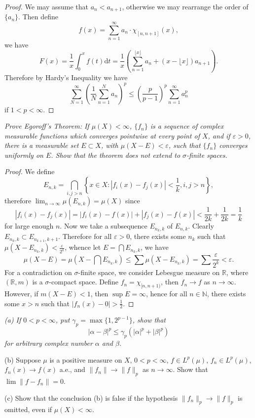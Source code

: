 \begin{proof}
We may assume that $a_n<a_{n+1}$, otherwise we may rearrange the order of $\{a_n\}$. Then define 
$$
f\left( x \right) =\sum_{n=1}^{\infty}{a_n\cdot \chi _{\left[ n,n+1 \right]}\left( x \right)},
$$
we have 
$$
F\left( x \right) =\frac{1}{x}\int_0^x{f\left( t \right) \mathrm{d}t}=\frac{1}{x}\left( \sum_{n=1}^{\lfloor x \rfloor}{a_n}+\left( x-\lfloor x \rfloor \right) a_{n+1} \right) .
$$
Therefore by Hardy's Inequality we have 
$$
\sum_{N=1}^{\infty}{\left( \frac{1}{N}\sum_{n=1}^N{a_n} \right) ^p}\le \left( \frac{p}{p-1} \right) ^p\sum_{n=1}^{\infty}{a_{n}^{p}}
$$
if $1<p<\infty$.
\end{proof}
\begin{problem}\em
Prove Egoroff's Theorem: If $\mu(X)<\infty$, $\{f_n\}$ is a sequence of complex measurable functions which converges pointwise at every point of $X$, and if $\varepsilon>0$, there is a measurable set $E\subset X$, with $\mu(X-E)<\varepsilon$, such that $\{f_n\}$ converges uniformly on $E$. Show that the theorem does not extend to $\sigma$-finite spaces.
\end{problem}
\begin{proof}
We define 
$$
E_{n,k}=\bigcap_{i,j>n}{\left\{ x\in X:\left| f_i\left( x \right) -f_j\left( x \right) \right|<\frac{1}{k},i,j>n \right\}},
$$
therefore $\lim_{n\rightarrow \infty} \mu \left( E_{n,k} \right) =\mu \left( X \right) $ since 
$$
\left| f_i\left( x \right) -f_j\left( x \right) \right|=\left| f_i\left( x \right) -f\left( x \right) \right|+\left| f_j\left( x \right) -f\left( x \right) \right|<\frac{1}{2k}+\frac{1}{2k}=\frac{1}{k}
$$
for large enough $n$. Now we take a subsequence $E_{n_k,k}$ of $E_{n,k}$. Clearly $E_{n_k,k}\subset E_{n_{k+1},k+1}$. Therefore for all $\varepsilon>0$, there exists some $n_k$ such that $\mu \left( X-E_{n_k,k} \right) <\frac{\varepsilon}{2^k}$, whence let $E=\bigcap{E_{n_k,k}}$, we have 
$$
\mu \left( X-E \right) =\mu \left( X-\bigcap{E_{n_k,k}} \right) \le \sum{\mu \left( X-E_{n_k,k} \right)}=\sum{\frac{\varepsilon}{2^k}}<\varepsilon .
$$
For a contradiction on $\sigma$-finite space, we consider Lebesgue measure on $\mathbb{R}$, where $(\mathbb{R},m)$ is a $\sigma$-compact space. Define $f_n=\chi_{[n,n+1)}$, then $f_n\to f$ as $n\to\infty$. However, if $m(X-E)<1$, then $\sup E=\infty$, hence for all $n\in\mathbb{N}$, there exists some $x>n$ such that $|f_n(x)-0|>\frac{1}{2}$.
\end{proof}
\begin{problem}\em
(a) If $0<p<\infty$, put $\gamma_p=\max\{1,2^{p-1}\}$, show that 
$$
\left| \alpha -\beta \right|^p\le \gamma _p\left( \left| \alpha \right|^p+\left| \beta \right|^p \right) 
$$
for arbitrary complex number $\alpha$ and $\beta$.\par
(b) Suppose $\mu$ is a positive measure on $X$, $0<p<\infty$, $f\in L^p(\mu)$, $f_n\in L^p(\mu)$, $f_n(x)\to f(x)$ a.e., and $\|f_n\|\to\|f\|_p$ as $n\to\infty$. Show that $\lim\|f-f_n\|=0$.\par
(c) Show that the conclusion (b) is false if the hypothesis $\|f_n\|_p\to\|f\|_p$ is omitted, even if $\mu(X)<\infty$.
\end{problem}
